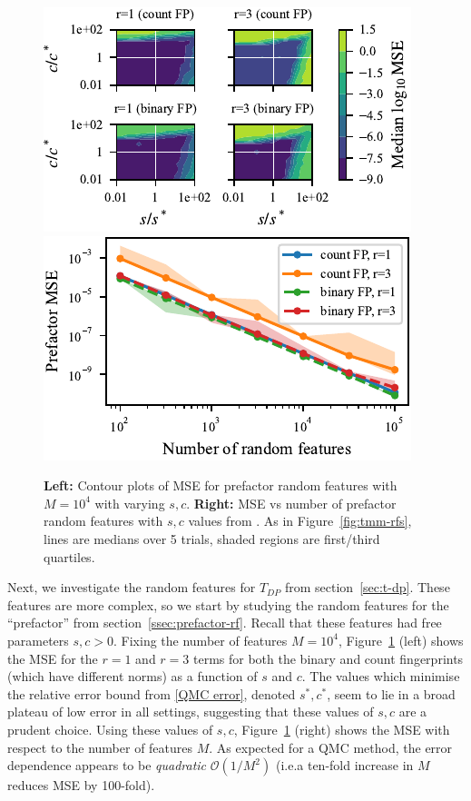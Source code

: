 \begin{figure}
    \centering
    \includegraphics{chapter0x-TRF/new-figures/tdp_prefactor_contours.pdf}
    \includegraphics{chapter0x-TRF/new-figures/prefactor_mse.pdf}
    \caption[Errors of TDP prefactor random features on real data.]{
    \textbf{Left:} Contour plots of MSE for prefactor random features with $M=10^4$ with varying $s,c$.
    \textbf{Right:} MSE vs number of prefactor random features with $s,c$ values from .
    As in Figure~\ref{fig:tmm-rfs}, lines are medians over 5 trials, shaded regions are first/third quartiles.
    }
    \label{fig:prefactor-rfs}
\end{figure}

Next, we investigate the random features for $T_{DP}$ from section~\ref{sec:t-dp}.
These features are more complex, so we start by studying the random features for the ``prefactor''
from section~\ref{ssec:prefactor-rf}.
Recall that these features had free parameters $s,c>0$.
Fixing the number of features $M=10^4$,
Figure~\ref{fig:prefactor-rfs} (left) shows the MSE for the $r=1$ and $r=3$ terms
for both the binary and count fingerprints (which have different norms) as a function of $s$ and $c$.
The values which minimise the relative error bound from \cref{QMC error},
denoted $s^*,c^*$,
seem to lie in a broad plateau of low error in all settings,
suggesting that these values of $s,c$ are a prudent choice.
Using these values of $s,c$,
Figure~\ref{fig:prefactor-rfs} (right) shows the MSE with respect to the number of features $M$.
As expected for a QMC method,
the error dependence appears to be \emph{quadratic} $\mathcal O(1/M^2)$ (i.e.\@ a ten-fold increase in $M$ reduces MSE by 100-fold).


